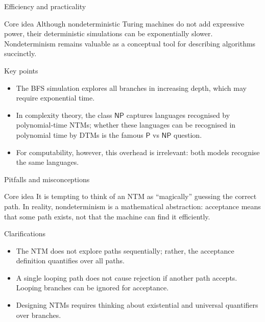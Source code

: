 \begin{frame}[t]{Efficiency and practicality}
  \begin{tblock}{Core idea}
    Although nondeterministic Turing machines do not add expressive
    power, their deterministic simulations can be exponentially slower.
    Nondeterminism remains valuable as a conceptual tool for describing
    algorithms succinctly.
  \end{tblock}
  \begin{tblock}{Key points}
    \begin{itemize}
      \item The BFS simulation explores all branches in increasing
        depth, which may require exponential time.
      \item In complexity theory, the class $\mathsf{NP}$ captures
        languages recognised by polynomial‑time NTMs; whether these
        languages can be recognised in polynomial time by DTMs is the
        famous $\mathsf{P}$ vs $\mathsf{NP}$ question.
      \item For computability, however, this overhead is irrelevant:
        both models recognise the same languages.
    \end{itemize}
  \end{tblock}
  \label{fr:7.7-09}
\end{frame}

\begin{frame}[t]{Pitfalls and misconceptions}
  \begin{tblock}{Core idea}
    It is tempting to think of an NTM as “magically” guessing the
    correct path.  In reality, nondeterminism is a mathematical
    abstraction: acceptance means that some path exists, not that the
    machine can find it efficiently.
  \end{tblock}
  \begin{tblock}{Clarifications}
    \begin{itemize}
      \item The NTM does not explore paths sequentially; rather, the
        acceptance definition quantifies over all paths.
      \item A single looping path does not cause rejection if another
        path accepts.  Looping branches can be ignored for acceptance.
      \item Designing NTMs requires thinking about existential and
        universal quantifiers over branches.
    \end{itemize}
  \end{tblock}
  \label{fr:7.7-10}
\end{frame}

